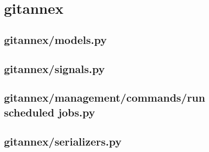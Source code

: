 %


\section{gitannex}



%

\subsection{gitannex/models.py}


\subsection{gitannex/signals.py}


\subsection{gitannex/management/commands/run scheduled jobs.py}


%

\subsection{gitannex/serializers.py}



